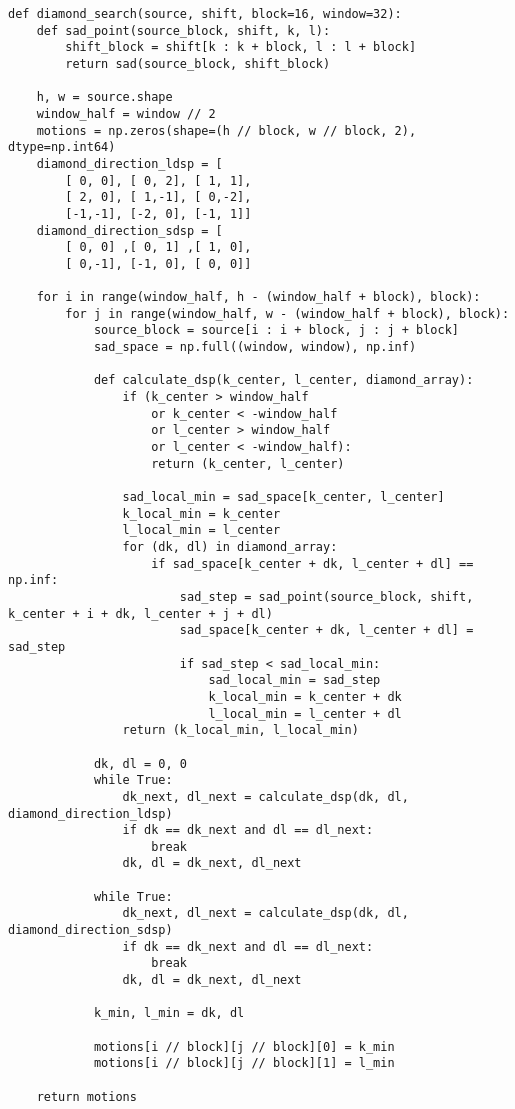\begin{lstlisting}[caption={Фунукция для применения билатерального фильтра}]
def diamond_search(source, shift, block=16, window=32):
    def sad_point(source_block, shift, k, l):
        shift_block = shift[k : k + block, l : l + block]
        return sad(source_block, shift_block)

    h, w = source.shape
    window_half = window // 2
    motions = np.zeros(shape=(h // block, w // block, 2), dtype=np.int64)
    diamond_direction_ldsp = [
        [ 0, 0], [ 0, 2], [ 1, 1],
        [ 2, 0], [ 1,-1], [ 0,-2],
        [-1,-1], [-2, 0], [-1, 1]]
    diamond_direction_sdsp = [
        [ 0, 0] ,[ 0, 1] ,[ 1, 0],
        [ 0,-1], [-1, 0], [ 0, 0]]
    
    for i in range(window_half, h - (window_half + block), block):
        for j in range(window_half, w - (window_half + block), block):
            source_block = source[i : i + block, j : j + block]
            sad_space = np.full((window, window), np.inf)
            
            def calculate_dsp(k_center, l_center, diamond_array):
                if (k_center > window_half
                    or k_center < -window_half
                    or l_center > window_half
                    or l_center < -window_half): 
                    return (k_center, l_center)

                sad_local_min = sad_space[k_center, l_center]
                k_local_min = k_center
                l_local_min = l_center
                for (dk, dl) in diamond_array:
                    if sad_space[k_center + dk, l_center + dl] == np.inf:
                        sad_step = sad_point(source_block, shift, k_center + i + dk, l_center + j + dl)
                        sad_space[k_center + dk, l_center + dl] = sad_step
                        if sad_step < sad_local_min:
                            sad_local_min = sad_step
                            k_local_min = k_center + dk
                            l_local_min = l_center + dl
                return (k_local_min, l_local_min)
        
            dk, dl = 0, 0
            while True:
                dk_next, dl_next = calculate_dsp(dk, dl, diamond_direction_ldsp)
                if dk == dk_next and dl == dl_next:
                    break
                dk, dl = dk_next, dl_next
            
            while True:                
                dk_next, dl_next = calculate_dsp(dk, dl, diamond_direction_sdsp)
                if dk == dk_next and dl == dl_next:
                    break
                dk, dl = dk_next, dl_next
                      
            k_min, l_min = dk, dl

            motions[i // block][j // block][0] = k_min
            motions[i // block][j // block][1] = l_min
            
    return motions
\end{lstlisting}

